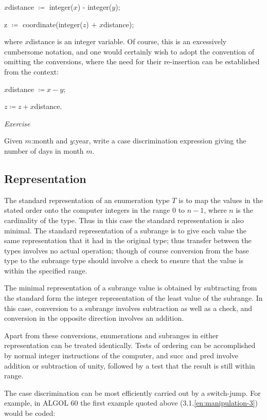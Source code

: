 \begin{enumerate}[leftmargin=2\parindent, label=(\arabic*)]
	\quad $x$distance $\coloneq$ integer($x$) - integer($y$);
	
	\quad z $\coloneq$ coordinate(integer($z$) $+$ $x$distance);
	
	where $x$distance is an integer variable. Of course, this is an excessively cumbersome notation, and one would certainly wish to adopt the convention of omitting the conversions, where the need for their re-insertion can be established from the context:
	
	$x$distance $\coloneq x - y$;
	
	$z \coloneq z + x$distance.
\end{enumerate}

\noindent
\textit{Exercise}

\noindent
Given $m$:month and $y$:year, write a case discrimination expression giving the number of days in month $m$.

\subsection{Representation}

The standard representation of an enumeration type $T$ is to map the values in the stated order onto the computer integers in the range 0 to $n - 1$, where $n$ is the cardinality of the type. Thus in this case the standard representation is also minimal. The standard representation of a subrange is to give each value the same representation that it had in the original type; thus transfer between the types involves no actual operation; though of course conversion from the base type to the subrange type should involve a check to ensure that the value is within the specified range.

The minimal representation of a subrange value is obtained by subtracting from the standard form the integer representation of the least value of the subrange. In this case, conversion to a subrange involves subtraction as well as a check, and conversion in the opposite direction involves an addition.

Apart from these conversions, enumerations and subranges in either representation can be treated identically. Tests of ordering can be accomplished by normal integer instructions of the computer, and succ and pred involve addition or subtraction of unity, followed by a test that the result is still within range.

The case discrimination can be most efficiently carried out by a switch-jump. For example, in ALGOL 60 the first example quoted above (3.1.\ref{en:manipulation-3}) would be coded:

